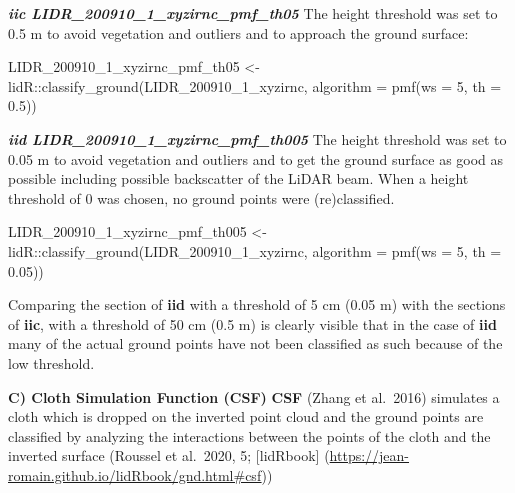 \documentclass[
  12pt,
]{article}
\newenvironment{Shaded}{\begin{snugshade}}{\end{snugshade}}
\newcommand{\AttributeTok}[1]{\textcolor[rgb]{0.77,0.63,0.00}{#1}}
\newcommand{\DecValTok}[1]{\textcolor[rgb]{0.00,0.00,0.81}{#1}}
\newcommand{\FloatTok}[1]{\textcolor[rgb]{0.00,0.00,0.81}{#1}}
\newcommand{\FunctionTok}[1]{\textcolor[rgb]{0.00,0.00,0.00}{#1}}
\newcommand{\NormalTok}[1]{#1}
\newcommand{\OtherTok}[1]{\textcolor[rgb]{0.56,0.35,0.01}{#1}}
\newcommand{\SpecialCharTok}[1]{\textcolor[rgb]{0.00,0.00,0.00}{#1}}
\begin{document}
\textbf{\emph{iic LIDR\_200910\_1\_xyzirnc\_pmf\_th05}}
\newline
The height threshold was set to 0.5 m to avoid vegetation and outliers and to approach the ground surface:

\begin{Shaded}
\begin{Highlighting}[]
\NormalTok{LIDR\_200910\_1\_xyzirnc\_pmf\_th05 }\OtherTok{\textless{}{-}}\NormalTok{ lidR}\SpecialCharTok{::}\FunctionTok{classify\_ground}\NormalTok{(LIDR\_200910\_1\_xyzirnc, }\AttributeTok{algorithm =} \FunctionTok{pmf}\NormalTok{(}\AttributeTok{ws =} \DecValTok{5}\NormalTok{,}
    \AttributeTok{th =} \FloatTok{0.5}\NormalTok{))}
\end{Highlighting}
\end{Shaded}

\textbf{\emph{iid LIDR\_200910\_1\_xyzirnc\_pmf\_th005}}
\newline
The height threshold was set to 0.05 m to avoid vegetation and outliers and to get the ground surface as good as possible including possible backscatter of the LiDAR beam. When a height threshold of 0 was chosen, no ground points were (re)classified.

\begin{Shaded}
\begin{Highlighting}[]
\NormalTok{LIDR\_200910\_1\_xyzirnc\_pmf\_th005 }\OtherTok{\textless{}{-}}\NormalTok{ lidR}\SpecialCharTok{::}\FunctionTok{classify\_ground}\NormalTok{(LIDR\_200910\_1\_xyzirnc, }\AttributeTok{algorithm =} \FunctionTok{pmf}\NormalTok{(}\AttributeTok{ws =} \DecValTok{5}\NormalTok{,}
    \AttributeTok{th =} \FloatTok{0.05}\NormalTok{))}
\end{Highlighting}
\end{Shaded}

Comparing the section of \textbf{iid} with a threshold of 5 cm (0.05 m) with the sections of \textbf{iic}, with a threshold of 50 cm (0.5 m) is clearly visible that in the case of \textbf{iid} many of the actual ground points have not been classified as such because of the low threshold.

\textbf{C) Cloth Simulation Function (CSF)}
\newline
\textbf{CSF} (Zhang et al.~2016) simulates a cloth which is dropped on the inverted point cloud and the ground points are classified by analyzing the interactions between the points of the cloth and the inverted surface (Roussel et al.~2020, 5; {[}lidRbook{]} (\url{https://jean-romain.github.io/lidRbook/gnd.html\#csf}))
\end{document}
